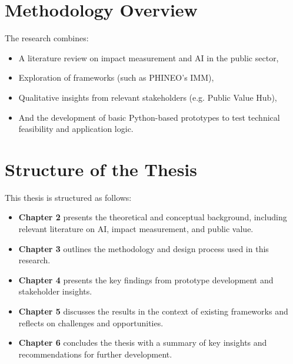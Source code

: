 \section{Methodology Overview}

The research combines:
\begin{itemize}
\item
A literature review on impact measurement and AI in the public sector,
\item
Exploration of frameworks (such as PHINEO’s IMM),
\item
Qualitative insights from relevant stakeholders (e.g. Public Value Hub),
\item
And the development of basic Python-based prototypes to test technical feasibility and application logic.
\end{itemize}

\section{Structure of the Thesis}

This thesis is structured as follows:

\begin{itemize}
\item
\textbf{Chapter 2} presents the theoretical and conceptual background, including relevant literature on AI, impact measurement, and public value.
\item
\textbf{Chapter 3} outlines the methodology and design process used in this research.
\item
\textbf{Chapter 4} presents the key findings from prototype development and stakeholder insights.
\item
\textbf{Chapter 5} discusses the results in the context of existing frameworks and reflects on challenges and opportunities.
\item
\textbf{Chapter 6} concludes the thesis with a summary of key insights and recommendations for further development.
\end{itemize}